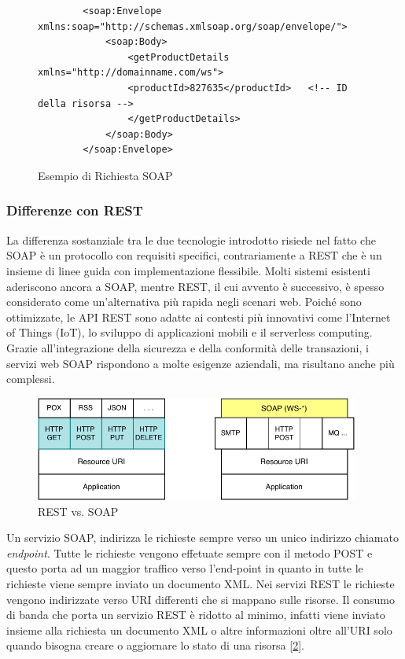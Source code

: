 \begin{figure}[H]
    \begin{verbatim}
        <soap:Envelope xmlns:soap="http://schemas.xmlsoap.org/soap/envelope/">
            <soap:Body>
                <getProductDetails xmlns="http://domainname.com/ws">
                <productId>827635</productId>   <!-- ID della risorsa -->
                </getProductDetails>
            </soap:Body>
        </soap:Envelope>
    \end{verbatim}
    \caption{Esempio di Richiesta SOAP}
    \label{fig:soaprequest}
\end{figure}


\subsubsection{Differenze con REST}
La differenza sostanziale tra le due tecnologie introdotto risiede nel fatto che SOAP è un protocollo con requisiti specifici, contrariamente a REST che è un insieme di linee guida con implementazione flessibile. Molti sistemi esistenti aderiscono ancora a SOAP, mentre REST, il cui avvento è successivo, è spesso considerato come un'alternativa più rapida negli scenari web. Poiché sono ottimizzate, le API REST sono adatte ai contesti più innovativi come l'Internet of Things (IoT), lo sviluppo di applicazioni mobili e il serverless computing. Grazie all'integrazione della sicurezza e della conformità delle transazioni, i servizi web SOAP rispondono a molte esigenze aziendali, ma risultano anche più complessi.

\begin{figure}[H]
    \centering
    \includegraphics[width=0.95\textwidth]{images/01_12_rest_vs_soap.pdf}
    \caption{REST vs. SOAP}
    \label{fig:restvssoap}
\end{figure}

Un servizio SOAP, indirizza le richieste sempre verso un unico indirizzo chiamato \textit{endpoint}. Tutte le richieste vengono effetuate sempre con il metodo POST e questo porta ad un maggior traffico verso l’end-point in quanto in tutte le richieste viene sempre inviato un documento XML. Nei servizi REST le richieste vengono indirizzate verso URI differenti che si mappano sulle risorse. Il consumo di banda che porta un servizio REST è ridotto al minimo, infatti viene inviato insieme alla richiesta un documento XML o altre informazioni oltre all’URI solo quando bisogna creare o aggiornare lo stato di una risorsa [\ref{fig:restvssoap}].